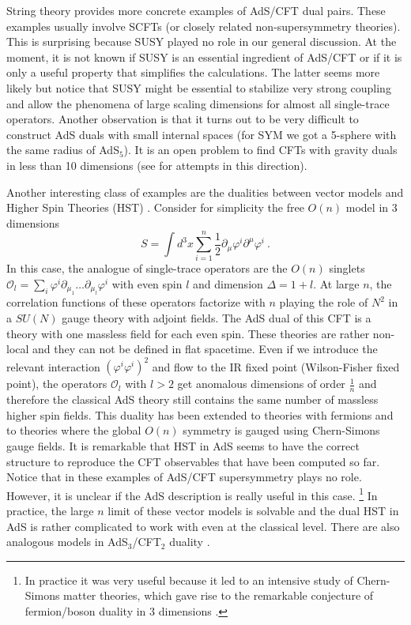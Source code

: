 \documentclass{ws-rv9x6}
\newcommand\be{\begin{equation}}
\newcommand\ee{\end{equation}}
\begin{document}
String theory provides more concrete examples of AdS/CFT dual pairs.
These examples usually involve SCFTs (or closely related non-supersymmetry
theories). This is surprising because SUSY played no role in our general
discussion. At the moment, it is not known if SUSY is an essential
ingredient of AdS/CFT or if it is only a useful property that simplifies
the calculations. The latter seems more likely but notice that SUSY
might be essential to stabilize very strong coupling and allow the
phenomena of large scaling dimensions for almost all single-trace
operators. Another observation is that it turns out to be very difficult
to construct AdS duals with small internal spaces (for SYM we got
a 5-sphere with the same radius of AdS$_{5}$). It is an open problem
to find CFTs with gravity duals in less than 10 dimensions (see \cite{arXiv:0908.0756, arXiv:1412.6999}
for attempts in this direction).

Another interesting class of examples are the dualities between vector
models and Higher Spin Theories (HST) \cite{hep-th/0210114, hep-th/0205131}.
Consider for simplicity the free $O(n)$ model in 3 dimensions
\be
S=\int d^{3}x\sum_{i=1}^{n}\frac{1}{2}\partial_{\mu}\varphi^{i}\partial^{\mu}\varphi^{i}\ .
\ee
In this case, the analogue of single-trace operators are the $O(n)$
singlets $\mathcal{O}_{l}=\sum_{i}\varphi^{i}\partial_{\mu_{1}}\dots\partial_{\mu_{l}}\varphi^{i}$
with even spin $l$ and dimension $\Delta=1+l$. At large $n$, the
correlation functions of these operators factorize with $n$ playing
the role of $N^{2}$ in a $SU(N)$ gauge theory with adjoint fields.
The AdS dual of this CFT is a theory with one massless field for each
even spin. These theories are rather non-local and they can not be
defined in flat spacetime. Even if we introduce the relevant interaction
$\left(\varphi^{i}\varphi^{i}\right)^{2}$ and flow to the IR fixed
point (Wilson-Fisher fixed point), the operators $\mathcal{O}_{l}$
with $l>2$ get anomalous dimensions of order $\frac{1}{n}$ and therefore
the classical AdS theory still contains the same number of massless
higher spin fields. This duality has been extended to theories with
fermions and to theories where the global $O(n)$ symmetry is gauged
using Chern-Simons gauge fields. It is remarkable that HST in AdS
seems to have the correct structure to reproduce the CFT observables
that have been computed so far. Notice that in these examples of AdS/CFT
supersymmetry plays no role. However, it is unclear if the AdS description
is really useful in this case.%
\footnote{In practice  it was  very useful because it led to an intensive
study of Chern-Simons matter theories, which gave rise to the remarkable
conjecture of fermion/boson duality in 3 dimensions \cite{arXiv:1110.4386, arXiv:1207.4593}.%
} In practice, the large $n$ limit of these vector models is solvable
and the dual HST in AdS is rather complicated to work with even at
the classical level. There are also analogous models in AdS$_{3}$/CFT$_{2}$
duality \cite{arXiv:1207.6697}.
\end{document}
